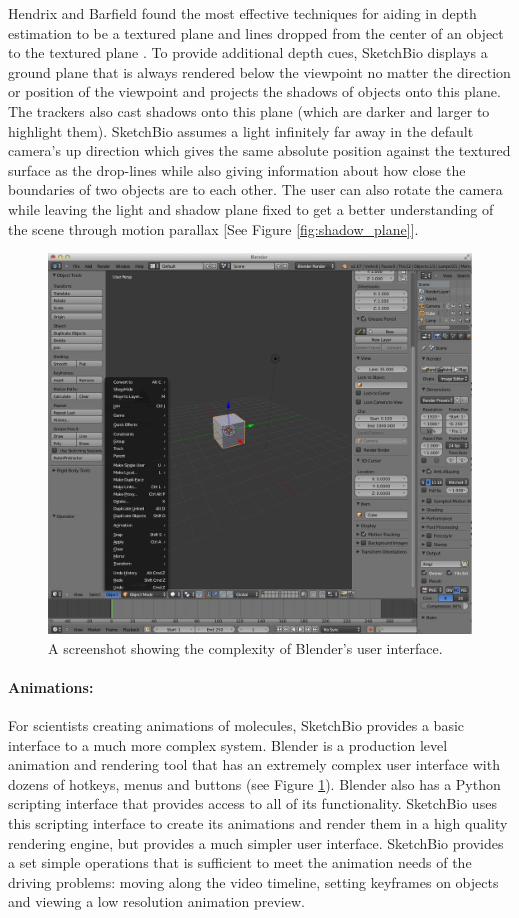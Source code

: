 \documentclass[twocolumn]{bmcart}%
\begin{document}
Hendrix and Barfield found the most effective techniques for aiding in depth estimation to be a textured plane and lines dropped from the center of an object to the textured plane \cite{hendrix1995relationship}.
To provide additional depth cues, SketchBio displays a ground plane that is always rendered below the viewpoint no matter the direction or position of the viewpoint and projects the shadows of objects onto this plane.
The trackers also cast shadows onto this plane (which are darker and larger to highlight them).
SketchBio assumes a light infinitely far away in the default camera's up direction which gives the same absolute position against the textured surface as the drop-lines while also giving information about how close the boundaries of two objects are to each other.
The user can also rotate the camera while leaving the light and shadow plane fixed to get a better understanding of the scene through motion parallax [See Figure \ref{fig:shadow_plane}].

\begin{figure}[h]
\centering
\includegraphics[width=0.9\columnwidth]{blender_interface.png}
\caption{A screenshot showing the complexity of Blender's user interface.}
\label{fig:blender_interface}
\end{figure}

\paragraph*{Animations:}
For scientists creating animations of molecules, SketchBio provides a basic interface to a much more complex system.
Blender is a production level animation and rendering tool that has an extremely complex user interface with dozens of hotkeys, menus and buttons (see Figure \ref{fig:blender_interface}).
Blender also has a Python scripting interface that provides access to all of its functionality.
SketchBio uses this scripting interface to create its animations and render them in a high quality rendering engine, but provides a much simpler user interface.
SketchBio provides a set simple operations that is sufficient to meet the animation needs of the driving problems: moving along the video timeline, setting keyframes on objects and viewing a low resolution animation preview.
\end{document}
